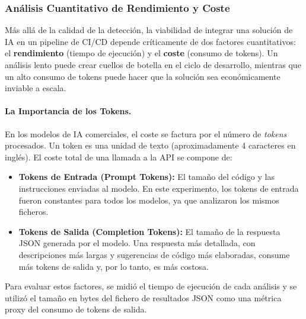 \subsubsection{Análisis Cuantitativo de Rendimiento y Coste}

Más allá de la calidad de la detección, la viabilidad de integrar una solución de IA en un pipeline de CI/CD depende críticamente de dos factores cuantitativos: el \textbf{rendimiento} (tiempo de ejecución) y el \textbf{coste} (consumo de tokens). Un análisis lento puede crear cuellos de botella en el ciclo de desarrollo, mientras que un alto consumo de tokens puede hacer que la solución sea económicamente inviable a escala.

\paragraph{La Importancia de los Tokens.} En los modelos de IA comerciales, el coste se factura por el número de \textit{tokens} procesados. Un token es una unidad de texto (aproximadamente 4 caracteres en inglés). El coste total de una llamada a la API se compone de:
\begin{itemize}
    \item \textbf{Tokens de Entrada (Prompt Tokens):} El tamaño del código y las instrucciones enviadas al modelo. En este experimento, los tokens de entrada fueron constantes para todos los modelos, ya que analizaron los mismos ficheros.
    \item \textbf{Tokens de Salida (Completion Tokens):} El tamaño de la respuesta JSON generada por el modelo. Una respuesta más detallada, con descripciones más largas y sugerencias de código más elaboradas, consume más tokens de salida y, por lo tanto, es más costosa.
\end{itemize}

Para evaluar estos factores, se midió el tiempo de ejecución de cada análisis y se utilizó el tamaño en bytes del fichero de resultados JSON como una métrica proxy del consumo de tokens de salida.


